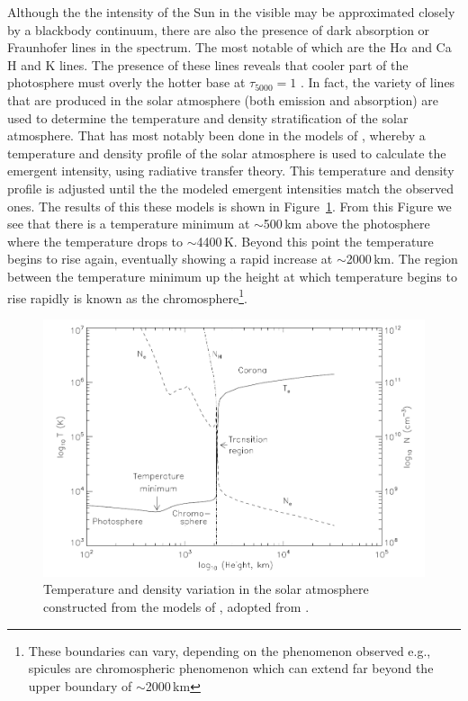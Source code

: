 Although the the intensity of the Sun in the visible may be approximated closely by a blackbody continuum, there are also the presence of dark absorption or Fraunhofer lines in the spectrum. The most notable of which are the H$\alpha$ and Ca H and K lines.  The presence of these lines reveals that cooler part of the photosphere must overly the hotter base at $\tau_{5000}=1$ \citep{phillips2008}. In fact, the variety of lines that are produced in the solar atmosphere (both emission and absorption) are used to determine the temperature and density stratification of the solar atmosphere.  That has most notably been done in the models of \citep{vernazza1981, fontenla1988, gabriel1976}, whereby a temperature and density profile of the solar atmosphere is used to calculate the emergent intensity, using radiative transfer theory. This temperature and density profile is adjusted until the the modeled emergent intensities match the observed ones. The results of this these models is shown in Figure~\ref{fig:val}. From this Figure we see that there is a temperature minimum at $\sim$500\,km above the photosphere where the temperature drops to $\sim$4400\,K. Beyond this point the temperature begins to rise again, eventually showing a rapid increase at $\sim$2000\,km. The region between the temperature minimum up the height at which temperature begins to rise rapidly is known as the chromosphere\footnote{These boundaries can vary, depending on the phenomenon observed e.g., spicules are chromospheric phenomenon which can extend far beyond the upper boundary of $\sim$2000\,km}. 


\begin{figure}[!t]
\begin{center}
\includegraphics[scale=0.4]{images/VAL.png}
\caption{Temperature and density variation in the solar atmosphere constructed from the models of \citep{vernazza1981, fontenla1988, gabriel1976}, adopted from \citep{phillips2008}.}
\label{fig:val} 
\end{center}
\end{figure}


